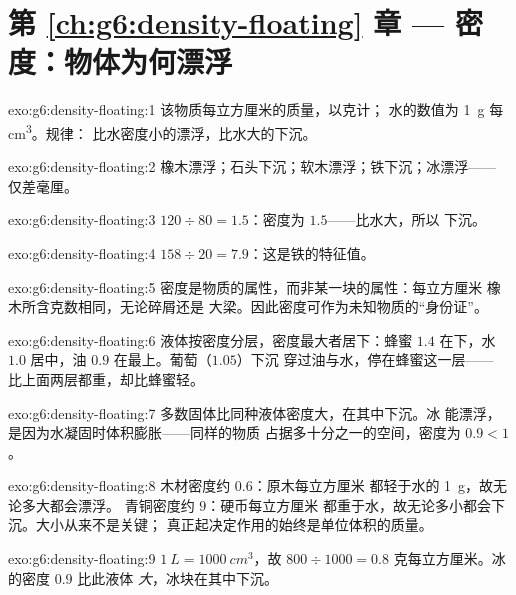 \section*{第 \ref{ch:g6:density-floating} 章 --- 密度：物体为何漂浮}

\begin{solution}{exo:g6:density-floating:1}
该物质每立方厘米的质量，以克计；
水的数值为 \qty{1}{g} 每 \unit{cm^3}。规律：
比水密度小的漂浮，比水大的下沉。
\end{solution}

\begin{solution}{exo:g6:density-floating:2}
橡木漂浮；石头下沉；软木漂浮；铁下沉；冰漂浮——
仅差毫厘。
\end{solution}

\begin{solution}{exo:g6:density-floating:3}
$120 \div 80 = 1.5$：密度为 $1.5$——比水大，所以
下沉。
\end{solution}

\begin{solution}{exo:g6:density-floating:4}
$158 \div 20 = 7.9$：这是铁的特征值。
\end{solution}

\begin{solution}{exo:g6:density-floating:5}
密度是物质的属性，而非某一块的属性：每立方厘米
橡木所含克数相同，无论碎屑还是
大梁。因此密度可作为未知物质的“身份证”。
\end{solution}

\begin{solution}{exo:g6:density-floating:6}
液体按密度分层，密度最大者居下：蜂蜜 $1.4$
在下，水 $1.0$ 居中，油 $0.9$ 在最上。葡萄（$1.05$）下沉
穿过油与水，停在蜂蜜这一层——
比上面两层都重，却比蜂蜜轻。
\end{solution}

\begin{solution}{exo:g6:density-floating:7}
多数固体比同种液体密度大，在其中下沉。冰
能漂浮，是因为水凝固时体积膨胀——同样的物质
占据多十分之一的空间，密度为 $0.9 < 1$。
\end{solution}

\begin{solution}{exo:g6:density-floating:8}
木材密度约 $0.6$：原木每立方厘米
都轻于水的 \qty{1}{g}，故无论多大都会漂浮。
青铜密度约 $9$：硬币每立方厘米
都重于水，故无论多小都会下沉。大小从来不是关键；
真正起决定作用的始终是单位体积的质量。
\end{solution}

\begin{solution}{exo:g6:density-floating:9}
$\qty{1}{L} = \qty{1000}{cm^3}$，故 $800 \div 1000 = 0.8$
克每立方厘米。冰的密度 $0.9$ 比此液体
\emph{大}，冰块在其中下沉。
\end{solution}

